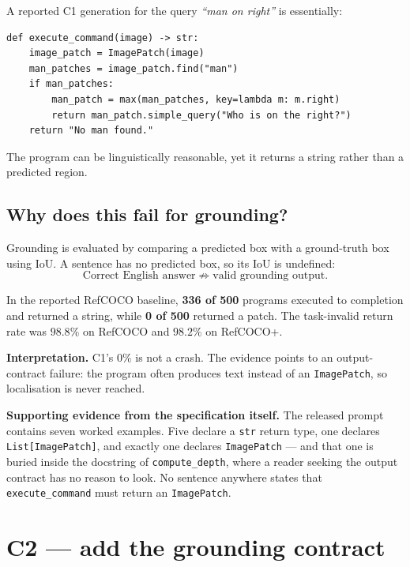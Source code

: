 \documentclass[11pt,a4paper]{article}
\begin{document}
A reported C1 generation for the query \emph{``man on right''} is essentially:

\begin{lstlisting}
def execute_command(image) -> str:
    image_patch = ImagePatch(image)
    man_patches = image_patch.find("man")
    if man_patches:
        man_patch = max(man_patches, key=lambda m: m.right)
        return man_patch.simple_query("Who is on the right?")
    return "No man found."
\end{lstlisting}

The program can be linguistically reasonable, yet it returns a string rather than a
predicted region.

\subsection{Why does this fail for grounding?}

Grounding is evaluated by comparing a predicted box with a ground-truth box using IoU.
A sentence has no predicted box, so its IoU is undefined:
\[
    \text{Correct English answer} \;\not\Rightarrow\; \text{valid grounding output.}
\]

In the reported RefCOCO baseline, \textbf{336 of 500} programs executed to completion
and returned a string, while \textbf{0 of 500} returned a patch. The task-invalid
return rate was $98.8\%$ on RefCOCO and $98.2\%$ on RefCOCO+.

\begin{finding}
\textbf{Interpretation.} C1's $0\%$ is not a crash. The evidence points to an
output-contract failure: the program often produces text instead of an
\texttt{ImagePatch}, so localisation is never reached.
\end{finding}

\begin{callout}
\textbf{Supporting evidence from the specification itself.} The released prompt
contains seven worked examples. Five declare a \texttt{str} return type, one declares
\texttt{List[ImagePatch]}, and exactly one declares \texttt{ImagePatch} --- and that
one is buried inside the docstring of \texttt{compute\_depth}, where a reader seeking
the output contract has no reason to look. No sentence anywhere states that
\texttt{execute\_command} must return an \texttt{ImagePatch}.
\end{callout}

\section{C2 --- add the grounding contract}
\end{document}
